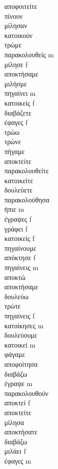 αποφοιτείτε  \\ 
πίνουν  \\ 
μίλησαν  \\ 
κατοικούν  \\ 
τρώμε  \\ 
παρακολουθείς m \\ 
μίλησε f \\ 
αποκτήσαμε  \\ 
μιλήσμε  \\ 
πηγαίνει m \\ 
κατοικείς f \\ 
διαβάζετε  \\ 
έφαγες f \\ 
τρώω  \\ 
τρώνε  \\ 
πήγαμε  \\ 
αποκτείτε  \\ 
παρακολουθείτε  \\ 
κατοικείτε  \\ 
δουλεύετε  \\ 
παρακολούθησα  \\ 
ήπιε m \\ 
έγραψες f \\ 
γράφει f \\ 
κατοικείς f \\ 
πηγαίνουμε  \\ 
απόκτησε f \\ 
πηγαίνεις m \\ 
αποκτώ  \\ 
αποκτήσαμε  \\ 
δουλεύω  \\ 
τρώτε  \\ 
πηγαίνεις f \\ 
κατοίκησες m \\ 
δουλεύουμε  \\ 
κατοικεί m \\ 
φάγαμε  \\ 
αποφοίτησα  \\ 
διαβάζω  \\ 
έγραψε m \\ 
παρακολουθούν  \\ 
αποκτεί f \\ 
αποκτείτε  \\ 
μίλησα  \\ 
αποκτήσατε  \\ 
διαβάζω  \\ 
μιλάει f \\ 
έφαγες m \\ 
